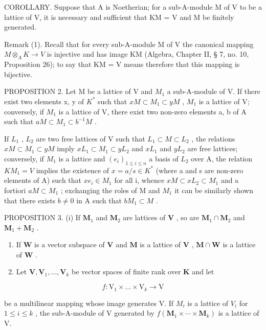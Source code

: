 COROLLARY. Suppose that A is Noetherian; for a sub-A-module M of V to be a lattice of V, it is necessary and sufficient that KM = V and M be finitely generated.

Remark (1). Recall that for every sub-A-module M of V the canonical mapping \(M \otimes_{A} K \to V\) is injective and has image KM (Algebra, Chapter II, § 7, no. 10, Proposition 26); to say that KM = V means therefore that this mapping is bijective.

PROPOSITION 2. Let M be a lattice of V and \(M_{1}\) a sub-A-module of V. If there exist two elements x, y of \(K^{*}\) such that \(xM \subset M_{1} \subset yM\) , \(M_{1}\) is a lattice of V; conversely, if \(M_{1}\) is a lattice of V, there exist two non-zero elements a, b of A such that \(aM \subset M_{1} \subset b^{-1}M\) .

If \(L_{1}\) , \(L_{2}\) are two free lattices of V such that \(L_{1} \subset M \subset L_{2}\) , the relations \(xM \subset M_{1} \subset yM\) imply \(xL_{1} \subset M_{1} \subset yL_{2}\) and \(xL_{1}\) and \(yL_{2}\) are free lattices; conversely, if \(M_{1}\) is a lattice and \((e_{i})_{1 \leqslant i \leqslant n}\) a basis of \(L_{2}\) over A, the relation \(KM_{1} = V\) implies the existence of \(x = a/s \in K^{*}\) (where a and s are non-zero elements of A) such that \(xe_{i} \in M_{1}\) for all i, whence \(xM \subset xL_{2} \subset M_{1}\) and a fortiori \(aM \subset M_{1}\) ; exchanging the roles of M and \(M_{1}\) it can be similarly shown that there exists \(b \neq 0\) in A such that \(bM_{1} \subset M\) .

PROPOSITION 3. (i) If \(\mathbf{M}_1\) and \(\mathbf{M}_2\) are lattices of \(\mathbf{V}\) , so are \(\mathbf{M}_1 \cap \mathbf{M}_2\) and \(\mathbf{M}_1 + \mathbf{M}_2\) .

\begin{enumerate}
\def\labelenumi{(\roman{enumi})}
\setcounter{enumi}{1}
\item
  If \(\mathbf{W}\) is a vector subspace of \(\mathbf{V}\) and \(\mathbf{M}\) is a lattice of \(\mathbf{V}\) , \(\mathbf{M} \cap \mathbf{W}\) is a lattice of \(\mathbf{W}\) .
\item
  Let \(\mathbf{V},\mathbf{V}_1,\ldots ,\mathbf{V}_k\) be vector spaces of finite rank over \(\mathbf{K}\) and let
\end{enumerate}

\[
f \colon \mathrm{V} _ {1} \times \dots \times \mathrm{V} _ {k} \rightarrow \mathrm{V}
\]

be a multilinear mapping whose image generates V. If \(M_{i}\) is a lattice of \(V_{i}\) for \(1 \leqslant i \leqslant k\) , the sub-A-module of V generated by \(f(\mathbf{M}_{1} \times \cdots \times \mathbf{M}_{k})\) is a lattice of V.


